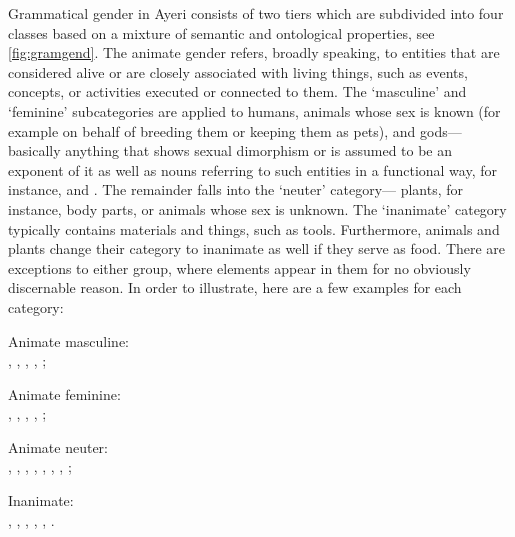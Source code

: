 Grammatical gender in Ayeri consists of two tiers which are subdivided into
four classes based on a mixture of semantic and ontological properties, see
\autoref{fig:gramgend}. The animate gender refers, broadly speaking, to 
entities that are considered alive or are closely associated with living
things, such as events, concepts, or activities executed or connected to them.
The `masculine' and `feminine' subcategories are applied to humans, animals
whose sex is known (for example on behalf of breeding them or keeping them as
pets), and gods---basically anything that shows sexual dimorphism or is assumed
to be an exponent of it as well as nouns referring to such entities in a
functional way, for instance,  and
. The remainder falls into the `neuter' category---
plants, for instance, body parts, or animals whose sex is unknown. The
`inanimate' category typically contains materials and things, such as tools.
Furthermore, animals and plants change their category to inanimate as well if
they serve as food. There are exceptions to either group, where elements appear
in them for no obviously discernable reason. In order to illustrate, here are a
few examples for each category:

\pex
	\a Animate masculine:\\
		, 
		, 
		, 
		, 
		;
	
	\a Animate feminine:\\
		, 
		, 
		, 
		, 
		;
	
	\a Animate neuter:\\
		,
		,
		,
		,
		,
		, 
		,
		;
	
	\a Inanimate:\\
		,
		,
		,
		,
		,
		.
\xe

